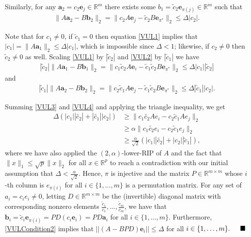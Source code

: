 \documentclass[journal,onecolumn]{IEEEtran}
\begin{document}
Similarly, for any $\mathbf{a}_2 = c_2\mathbf{e}_j \in \mathbb{R}^m$ there exists some $b_1 = \tilde c_2 \mathbf{e}_{\pi(j)} \in \mathbb{R}^m$ such that
\begin{align}\label{VUL2}
\|A\mathbf{a}_2 - B\mathbf{b}_2\|_2 = \|c_2A\mathbf{e}_j - \tilde{c}_2B\mathbf{e}_{\pi^*}\|_2 \leq \Delta |c_2|.
\end{align}

Note that for $c_1 \neq 0$, if $\tilde c_1 = 0$ then equation \eqref{VUL1} implies that $|c_1| =\|A\mathbf{a}_1\|_2 \leq \Delta |c_1|$, which is impossible since $\Delta < 1$; likewise, if $c_2 \neq 0$ then $\tilde c_2 \neq 0$ as well. Scaling \eqref{VUL1} by $|\tilde c_2|$ and \eqref{VUL2} by $|\tilde c_1|$ we have
\begin{align}\label{VUL3}
|\tilde c_2|\|A\mathbf{a}_1 - B\mathbf{b}_1\|_2 = \|c_1\tilde c_2A\mathbf{e}_i - \tilde{c}_1\tilde c_2B\mathbf{e}_{\pi^*}\|_2 \leq \Delta |c_1||\tilde c_2|
\end{align}
%
and
\begin{align}\label{VUL4}
|\tilde c_1|\|A\mathbf{a}_2 - B\mathbf{b}_2\|_2 = \|c_2\tilde c_1A\mathbf{e}_j - \tilde c_1 \tilde{c}_2B\mathbf{e}_{\pi^*}\|_2 \leq \Delta |\tilde c_1||c_2|.
\end{align}
 
Summing \eqref{VUL3} and \eqref{VUL4} and applying the triangle inequality, we get
\begin{align*}
\Delta(|c_1||\tilde{c_2}|+ |\tilde{c_1}| |c_2|) &\geq  \|c_1\tilde{c_2}Ae_i - c_2\tilde{c}_1Ae_j\|_2 \\
&\geq \alpha \|c_1\tilde{c_2}e_i - c_2\tilde{c}_1e_j\|_2 \\
&\geq \frac{\alpha}{\sqrt{2}}(|c_1| |\tilde{c_2}| + |c_2| |\tilde{c}_1| ),
\end{align*}
%
where we have also applied the $(2,\alpha)$-lower-RIP of $A$ and the fact that $\|x\|_1 \leq \sqrt{p}\|x\|_2$ for all $x \in \mathbb{R}^p$ to reach a contradiction with our initial assumption that $\Delta < \frac{\alpha}{\sqrt{2}}$. Hence, $\pi$ is injective and the matrix $P \in \mathbb{R}^{m \times m}$ whose $i$-th column is $e_{\pi(i)}$ for all $i \in \{1, \ldots, m\}$ is a permutation matrix. For any set of $a_i = c_ie_i \neq 0$, letting $D \in \mathbb{R}^{m \times m}$ be the (invertible) diagonal matrix with corresponding nonzero elements $\frac{\tilde{c}_1}{c_1}, ..., \frac{\tilde{c}_m}{c_m}$, we have that $\mathbf{b}_i = \tilde{c}_i\mathbf{e}_{\pi(i)} = PD(c_i\mathbf{e}_i) = PD\mathbf{a}_i$ for all $i \in \{1, \ldots, m\}$. Furthermore, \eqref{VULCondition2} implies that $||(A - BPD)\mathbf{e}_i|| \leq \Delta$ for all $i \in \{1, \ldots, m\}. \indent \blacksquare$
\end{document}
